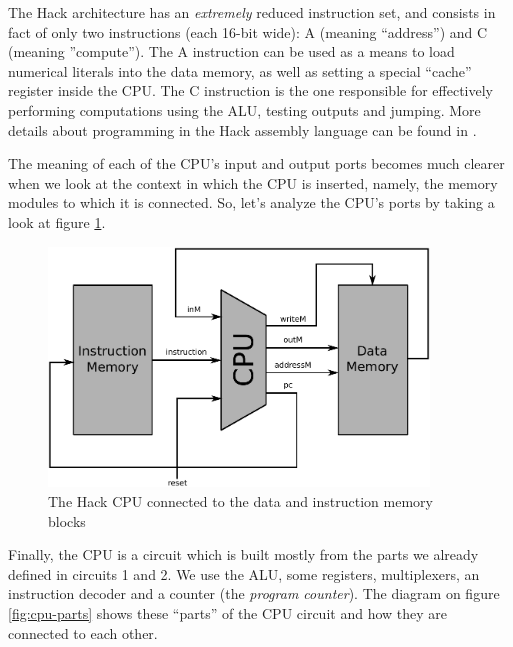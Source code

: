 \documentclass[a4paper]{article}
\begin{document}
            The Hack architecture has an \emph{extremely} reduced instruction set, and consists in
            fact of only two instructions (each 16-bit wide): A (meaning ``address'') and
            C (meaning ''compute''). The A instruction can be used as a means to load numerical
            literals into the data memory, as well as setting a special ``cache'' register inside
            the CPU. The C instruction is the one responsible for effectively performing
            computations using the ALU, testing outputs and jumping. More details about programming
            in the Hack assembly language can be found in \cite{nand2tetris-chapter-assembly}.

            The meaning of each of the CPU's input and output ports becomes much clearer when we
            look at the context in which the CPU is inserted, namely, the memory modules to which it
            is connected. So, let's analyze the CPU's ports by taking a look at figure
            \ref{fig:cpu-memory}.

            \begin{figure}[h!]
                \begin{center}
                    \includegraphics[width=0.9\textwidth]{imgs/cpu-memory.pdf}
                \end{center}
                \caption{The Hack CPU connected to the data and instruction memory blocks
                    \label{fig:cpu-memory}}
            \end{figure}

            Finally, the CPU is a circuit which is built mostly from the parts we already defined in
            circuits 1 and 2. We use the ALU, some registers, multiplexers, an instruction decoder
            and a counter (the \emph{program counter}). The diagram on figure \ref{fig:cpu-parts}
            shows these ``parts'' of the CPU circuit and how they are connected to each other.
\end{document}
